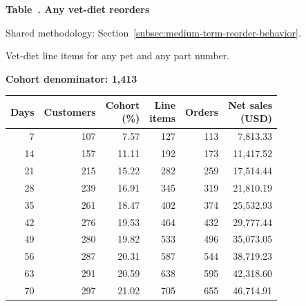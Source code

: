 \label{tab:financial-opportunity-new-chewy-any-vet-diet}
\par\smallskip\noindent\parbox[t][2\baselineskip][t]{\linewidth}{\raggedright\textbf{Table~\thetable. Any vet-diet reorders}}
\par\raggedright\footnotesize Shared methodology: Section~\ref{subsec:medium-term-reorder-behavior}.
\par\noindent\parbox[t][2\baselineskip][t]{\linewidth}{\raggedright Vet-diet line items for any pet and any part number.}
\par\noindent\textbf{Cohort denominator: 1,413}
\par\centering\footnotesize
\setlength{\tabcolsep}{2pt}
\begin{tabular}{rrrrrr}\toprule
Days & Customers & \shortstack{Cohort\\(\%)} & \shortstack{Line\\items} & Orders & \shortstack{Net sales\\(USD)} \\ \midrule

7 & 107 & 7.57 & 127 & 113 & 7,813.33 \\

14 & 157 & 11.11 & 192 & 173 & 11,417.52 \\

21 & 215 & 15.22 & 282 & 259 & 17,514.44 \\

28 & 239 & 16.91 & 345 & 319 & 21,810.19 \\

35 & 261 & 18.47 & 402 & 374 & 25,532.93 \\

42 & 276 & 19.53 & 464 & 432 & 29,777.44 \\

49 & 280 & 19.82 & 533 & 496 & 35,073.05 \\

56 & 287 & 20.31 & 587 & 544 & 38,719.23 \\

63 & 291 & 20.59 & 638 & 595 & 42,318.60 \\

70 & 297 & 21.02 & 705 & 655 & 46,714.91 \\
\bottomrule\end{tabular}\par
